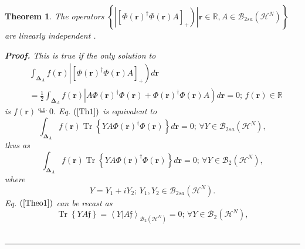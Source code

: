 \documentclass[aps,preprint]{revtex4}%
\newtheorem{theorem}{Theorem}
\newenvironment{proof}[1][Proof]{\noindent\textbf{#1.} }{\ \rule{0.5em}{0.5em}}
\begin{document}
\begin{theorem}
The operators $\left\{  \left.  \left\vert \left[  \Phi\left(  \boldsymbol{r}%
\right)  ^{\dagger}\Phi\left(  \boldsymbol{r}\right)  A\right]  _{+}\right)
\right\vert \mathbf{r\in}\mathbb{R},A\in\mathcal{B}_{2sa}\left(
\mathcal{H}^{N}\right)  \right\}  $ are linearly independent .

\begin{proof}
This is true if the only solution to
\begin{align}
&  \int_{\boldsymbol{\Delta}_{A}}f\left(  \boldsymbol{r}\right)  \left\vert
\left[  \Phi\left(  \boldsymbol{r}\right)  ^{\dagger}\Phi\left(
\boldsymbol{r}\right)  A\right]  _{+}\right)  d\boldsymbol{r}\nonumber\\
&  =\frac{1}{2}\int_{\boldsymbol{\Delta}_{A}}f\left(  \boldsymbol{r}\right)
\left\vert A\Phi\left(  \boldsymbol{r}\right)  ^{\dagger}\Phi\left(
\boldsymbol{r}\right)  +\Phi\left(  \boldsymbol{r}\right)  ^{\dagger}%
\Phi\left(  \boldsymbol{r}\right)  A\right)  d\boldsymbol{r}=0;\,f\left(
\boldsymbol{r}\right)  \in\mathbb{R} \label{Th1}%
\end{align}
is $f\left(  \boldsymbol{r}\right)  \overset{a.e.}{=}0.$ Eq. $\left(
\ref{Th1}\right)  $ is equivalent to
\begin{equation}
\int_{\boldsymbol{\Delta}_{A}}f\left(  \boldsymbol{r}\right)
\operatorname{Tr}\left\{  YA\Phi\left(  \boldsymbol{r}\right)  ^{\dagger}%
\Phi\left(  \boldsymbol{r}\right)  \right\}  d\boldsymbol{r}=0;\,\forall
Y\in\mathcal{B}_{2sa}\left(  \mathcal{H}^{N}\right)  ,
\end{equation}
thus as%
\begin{equation}
\int_{\boldsymbol{\Delta}_{A}}f\left(  \boldsymbol{r}\right)
\operatorname{Tr}\left\{  YA\Phi\left(  \boldsymbol{r}\right)  ^{\dagger}%
\Phi\left(  \boldsymbol{r}\right)  \right\}  d\boldsymbol{r}=0;\,\forall
Y\in\mathcal{B}_{2}\left(  \mathcal{H}^{N}\right)  , \label{Theo1}%
\end{equation}
where
\begin{equation}
Y=Y_{1}+iY_{2};\,Y_{1},Y_{2}\in\mathcal{B}_{2sa}\left(  \mathcal{H}%
^{N}\right)  .
\end{equation}
Eq. $\left(  \ref{Theo1}\right)  $ can be recast as%
\begin{equation}
\operatorname{Tr}\left\{  YA\mathfrak{f}\right\}  =\left\langle Y\left\vert
A\mathfrak{f}\right.  \right\rangle _{\mathcal{B}_{2}\left(  \mathcal{H}%
^{N}\right)  }=0;\,\forall Y\in\mathcal{B}_{2}\left(  \mathcal{H}^{N}\right)
, \label{p1}%

\end{equation}
\end{proof}
\end{theorem}
\end{document}

